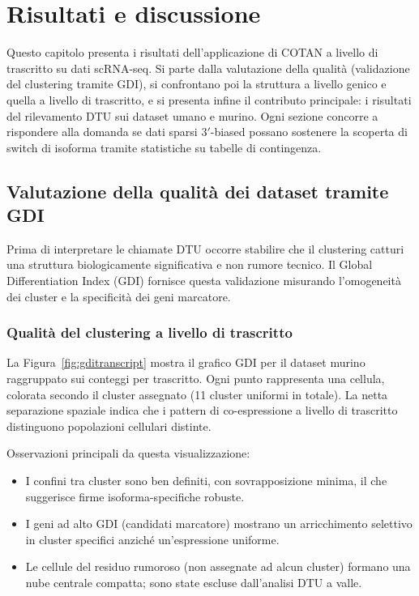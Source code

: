 \chapter{Risultati e discussione}

Questo capitolo presenta i risultati dell'applicazione di COTAN a livello di trascritto su dati scRNA-seq. Si parte dalla valutazione della qualità (validazione del clustering tramite GDI), si confrontano poi la struttura a livello genico e quella a livello di trascritto, e si presenta infine il contributo principale: i risultati del rilevamento DTU sui dataset umano e murino. Ogni sezione concorre a rispondere alla domanda se dati sparsi $3'$-biased possano sostenere la scoperta di switch di isoforma tramite statistiche su tabelle di contingenza.

\section{Valutazione della qualità dei dataset tramite GDI}

Prima di interpretare le chiamate DTU occorre stabilire che il clustering catturi una struttura biologicamente significativa e non rumore tecnico. Il Global Differentiation Index (GDI) fornisce questa validazione misurando l'omogeneità dei cluster e la specificità dei geni marcatore.

\subsection*{Qualità del clustering a livello di trascritto}\label{sec:gdi-transcript}

La Figura~\ref{fig:gditranscript} mostra il grafico GDI per il dataset murino raggruppato sui conteggi per trascritto. Ogni punto rappresenta una cellula, colorata secondo il cluster assegnato (11 cluster uniformi in totale). La netta separazione spaziale indica che i pattern di co-espressione a livello di trascritto distinguono popolazioni cellulari distinte.

Osservazioni principali da questa visualizzazione:
\begin{itemize}
    \item I confini tra cluster sono ben definiti, con sovrapposizione minima, il che suggerisce firme isoforma-specifiche robuste.
    \item I geni ad alto GDI (candidati marcatore) mostrano un arricchimento selettivo in cluster specifici anziché un'espressione uniforme.
    \item Le cellule del residuo rumoroso (non assegnate ad alcun cluster) formano una nube centrale compatta; sono state escluse dall'analisi DTU a valle.
\end{itemize}


